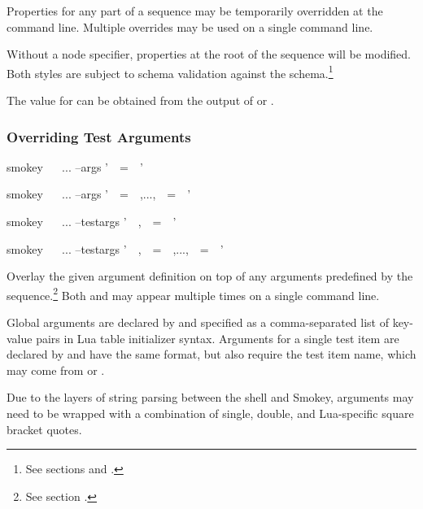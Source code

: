 Properties for any part of a sequence may be temporarily overridden at the
command line.  Multiple overrides may be used on a single command line.

Without a node specifier, properties at the root of the sequence will be
modified.  Both styles are subject to schema validation against the
schema.\footnote{See sections  and
.}

The value for  can be obtained from the output of
 or .

\subsubsection{Overriding Test Arguments}
\label{sec:SeqCmdLineArguments}

\begin{CommandLine}
smokey ~~ ... --args '~~=~~'
\end{CommandLine}

\begin{CommandLine}
smokey ~~ ... --args '~~=~~,...,~~=~~'
\end{CommandLine}

\begin{CommandLine}
smokey ~~ ... --testargs '~~,~~=~~'
\end{CommandLine}

\begin{CommandLine}
smokey ~~ ... --testargs '~~,~~=~~,...,~~=~~'
\end{CommandLine}

Overlay the given argument definition on top of any arguments predefined by the
sequence.\footnote{See section .} Both
 and  may appear multiple times on a single
command line.

Global arguments are declared by  and specified as a
comma-separated list of key-value pairs in Lua table initializer syntax.
Arguments for a single test item are declared by  and have
the same format, but also require the test item name, which may come from
 or .

Due to the layers of string parsing between the shell and Smokey, arguments may
need to be wrapped with a combination of single, double, and Lua-specific
square bracket quotes.

